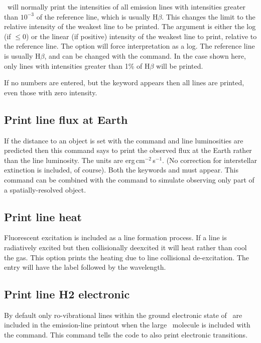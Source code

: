 \Cloudy\ will normally print the intensities of all emission lines with
intensities greater than $10^{-3}$ of the reference line,
which is usually H$\beta$.
This changes the limit to the relative intensity of the weakest line to
be printed.
The argument is either the log (if $\le 0$) or the linear (if
positive) intensity of the weakest line to print, relative to the reference line.
The  option will force interpretation as a log.
The reference
line is usually H$\beta$,
and can be changed with the  command.
In the case shown here, only lines with intensities
greater than 1\% of H$\beta$ will be printed.

If no numbers are entered, but the keyword  appears then all lines
are printed, even those with zero intensity.

\subsection{Print line flux at Earth}
\label{sec:line:flux:earth}

If the distance to an object is set with the
 command and line luminosities are predicted
then this command says to print the observed
flux at the Earth rather than the line luminosity.
The units are erg\,cm$^{-2}$\,s$^{-1}$.
(No correction for interstellar extinction is included, of course).
Both the keywords  and  must appear.
This command can be
combined with the 
command to simulate observing only part of
a spatially-resolved object.

\subsection{Print line heat}

Fluorescent excitation is included as a line formation process.
If a line is radiatively excited but then collisionally deexcited
it will heat rather than cool the gas.
This option prints the heating due to line
collisional de-excitation.
The entry will have the label  followed
by the wavelength.

\subsection{Print line H2 electronic}

By default only ro-vibrational lines within the ground electronic state
of \htwo\ are included in the emission-line printout when the
large \htwo\ molecule
is included with the  command.
This command
tells the code to also print electronic transitions.

